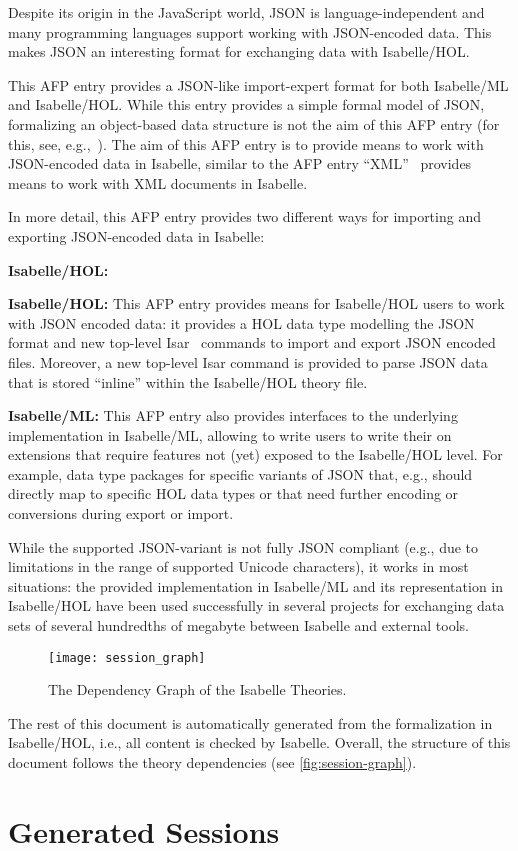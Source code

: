 \documentclass[11pt,DIV=12,a4paper,abstract=true,twoside=semi,openright]
{scrreprt}
\begin{document}
Despite its origin in the JavaScript world, JSON is language-independent and
many programming languages support working with JSON-encoded data. This makes
JSON an interesting format for exchanging data with Isabelle/HOL.
 
This AFP entry provides a JSON-like import-expert format for both Isabelle/ML
and Isabelle/HOL. While this entry provides a simple formal model of JSON,
formalizing an object-based data structure is not the aim of this AFP entry (for
this, see,
e.g.,~\cite{brucker.ea:extensible:2008-b,brucker.ea:afp-core-dom:2018}). The aim
of this AFP entry is to provide means to work with JSON-encoded data in
Isabelle, similar to the AFP entry ``XML''~\cite{sternagel.ea:xml:2014} provides
means to work with XML documents in Isabelle. 

In more detail, this AFP entry provides two different ways for importing and
exporting JSON-encoded data in Isabelle:
\begin{labeling}{\textbf{Isabelle/HOL:}}
\item[\textbf{Isabelle/HOL:}] This AFP entry provides means for Isabelle/HOL
      users to work with JSON encoded data: it provides a HOL data type
      modelling the JSON format and new top-level
      Isar~\cite{wenzel:isabelleisar:2002} commands to import and export JSON
      encoded files. Moreover, a new top-level Isar command is provided to parse
      JSON data that is stored ``inline'' within the Isabelle/HOL theory file. 
\item[\textbf{Isabelle/ML:}] This AFP entry also provides interfaces to the
      underlying implementation in Isabelle/ML, allowing to write users to
      write their on extensions that require features not (yet) exposed to the 
      Isabelle/HOL level. For example, data type packages for specific variants of JSON
      that, e.g., should directly map to specific HOL data types or that need
      further encoding or conversions during export or import. 
\end{labeling}

While the supported JSON-variant is not fully JSON compliant (e.g., due to
limitations in the range of supported Unicode characters), it works in most
situations: the provided implementation in Isabelle/ML and its representation in
Isabelle/HOL have been used successfully in several projects for exchanging data
sets of several hundredths of megabyte between Isabelle and external tools.

\begin{figure}
  \centering
  \texttt{[image: session\_graph]}
  \caption{The Dependency Graph of the Isabelle Theories.\label{fig:session-graph}}
\end{figure}
The rest of this document is automatically generated from the
formalization in Isabelle/HOL, i.e., all content is checked by
Isabelle.  Overall, the structure of this document follows the
theory dependencies (see \autoref{fig:session-graph}).

\clearpage
\tableofcontents

\chapter{Generated Sessions}


\printbibliography
\end{document}
